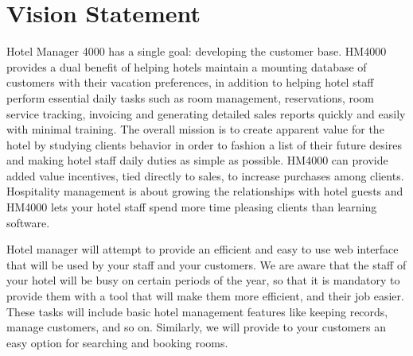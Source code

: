 \section{Vision Statement}
Hotel Manager 4000 has a single goal: developing the customer base. HM4000 provides a dual benefit of helping hotels maintain a mounting database of customers with their vacation preferences, in addition to helping hotel staff perform essential daily tasks such as room management, reservations, room service tracking, invoicing and generating detailed sales reports quickly and easily with minimal training. The overall mission is to create apparent value for the hotel by studying clients behavior in order to fashion a list of their future desires and making hotel staff daily duties as simple as possible. HM4000 can provide added value incentives, tied directly to sales, to increase purchases among clients. Hospitality management is about growing the relationships with hotel guests and HM4000 lets your hotel staff spend more time pleasing clients than learning software.

Hotel manager will attempt to provide an efficient and easy to use web interface that will be used by your staff and your customers.  We are aware that the staff of your hotel will be busy on certain periods of the year, so that it is mandatory to provide them with a tool that will make them more efficient, and their job easier. These tasks will include basic hotel management features like keeping records, manage customers, and so on.  Similarly, we will provide to your customers an easy option for searching and booking rooms.

